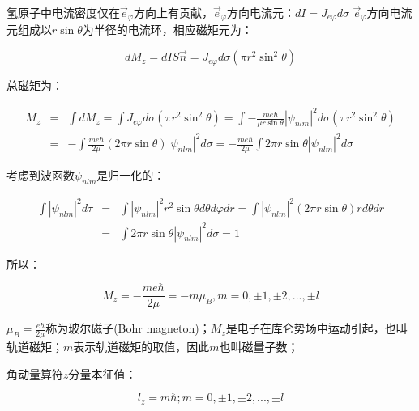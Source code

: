 氢原子中电流密度仅在$\vec e_\varphi  $方向上有贡献，$\vec e_\varphi  $方向电流元：$dI = J_{e\varphi } d\sigma $
$\vec e_\varphi  $方向电流元组成以$r\sin \theta $为半径的电流环，相应磁矩元为：


\begin{equation}
dM_z  = dIS\vec n = J_{e\varphi } d\sigma \left( {\pi r^2 \sin ^2 \theta } \right)
\end{equation}

总磁矩为：

\begin{eqnarray*}
M_z & = & \int {dM_z }  = \int {J_{e\varphi } d\sigma \left( {\pi r^2 \sin ^2 \theta } \right)}  = \int { - \frac{{me\hbar }}{{\mu r\sin \theta }}\left| {\psi _{nlm} } \right|^2 d\sigma \left( {\pi r^2 \sin ^2 \theta } \right)}  \\
{} & = &  - \int {\frac{{me\hbar }}{{2\mu }}} \left( {2\pi r\sin \theta } \right)\left| {\psi _{nlm} } \right|^2 d\sigma  =  - \frac{{me\hbar }}{{2\mu }}\int {2\pi r\sin \theta \left| {\psi _{nlm} } \right|^2 d\sigma }
\end{eqnarray*}

考虑到波函数$\psi _{nlm} $是归一化的：

\begin{eqnarray*}
\int {\left| {\psi _{nlm} } \right|^2 d\tau } & = & \int {\left| {\psi _{nlm} } \right|^2 r^2 \sin \theta d\theta d\varphi dr}  = \int {\left| {\psi _{nlm} } \right|^2 \left( {2\pi r\sin \theta } \right)rd\theta dr} \\
{} & = & \int {2\pi r\sin \theta \left| {\psi _{nlm} } \right|^2 d\sigma }  = 1
\end{eqnarray*}

所以：

\begin{equation}\label{15-15}
M_z  =  - \frac{{me\hbar }}{{2\mu }} =  - m\mu _B, m = 0, \pm 1, \pm 2,..., \pm l
\end{equation}


$\mu _B  = \frac{{e\hbar }}{{2\mu }}$称为玻尔磁子(Bohr
magneton)；$M_z$是电子在库仑势场中运动引起，也叫轨道磁矩；$m$表示轨道磁矩的取值，因此$m$也叫磁量子数；


角动量算符$z$分量本征值：

\begin{equation*}
l_z  = m\hbar; m = 0, \pm 1, \pm 2,..., \pm l
\end{equation*}

